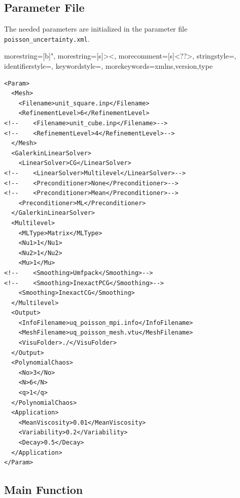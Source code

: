 \documentclass{article}
\begin{document}
\subsection{Parameter File}
\label{sec:program:subsec:param_file}

The needed parameters are initialized in the parameter file \texttt{poisson\_uncertainty.xml}.



{
  morestring=[b]",
  morestring=[s]{>}{<},
  morecomment=[s]{<?}{?>},
  stringstyle=\color{black},
  identifierstyle=\color{cyan},
  keywordstyle=\color{darkblue},
  morekeywords={xmlns,version,type}%
}

\lstset{
  language=XML
}

\begin{lstlisting}
<Param>
  <Mesh>
    <Filename>unit_square.inp</Filename>
    <RefinementLevel>6</RefinementLevel>
<!--    <Filename>unit_cube.inp</Filename>-->
<!--    <RefinementLevel>4</RefinementLevel>-->
  </Mesh>
  <GalerkinLinearSolver>
    <LinearSolver>CG</LinearSolver>
<!--    <LinearSolver>Multilevel</LinearSolver>-->
<!--    <Preconditioner>None</Preconditioner>-->
<!--    <Preconditioner>Mean</Preconditioner>-->
    <Preconditioner>ML</Preconditioner>
  </GalerkinLinearSolver>
  <Multilevel>
    <MLType>Matrix</MLType>
    <Nu1>1</Nu1>
    <Nu2>1</Nu2>
    <Mu>1</Mu>
<!--    <Smoothing>Umfpack</Smoothing>-->
<!--    <Smoothing>InexactPCG</Smoothing>-->
    <Smoothing>InexactCG</Smoothing>
  </Multilevel>
  <Output>
    <InfoFilename>uq_poisson_mpi.info</InfoFilename>
    <MeshFilename>uq_poisson_mesh.vtu</MeshFilename>
    <VisuFolder>./</VisuFolder>
  </Output>
  <PolynomialChaos>
    <No>3</No>
    <N>6</N>
    <q>1</q>
  </PolynomialChaos>
  <Application>
    <MeanViscosity>0.01</MeanViscosity>
    <Variability>0.2</Variability>
    <Decay>0.5</Decay>
  </Application>
</Param>
\end{lstlisting}
\vspace{15pt}

\subsection{Main Function}
\label{sec:program:subsec:main_func}
\end{document}
